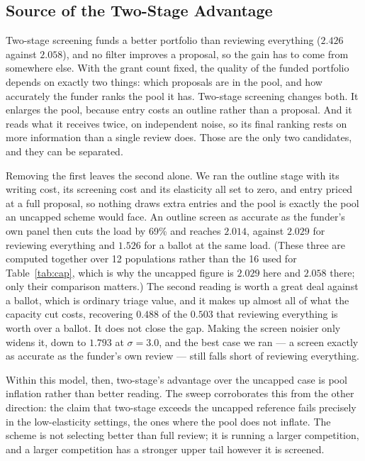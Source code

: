 \documentclass[11pt,a4paper]{article}
\begin{document}
\subsection{Source of the Two-Stage Advantage}
\label{sec:why}

Two-stage screening funds a better portfolio than reviewing everything ($2.426$
against $2.058$), and no filter improves a proposal, so the gain has to come from
somewhere else. With the grant count fixed, the quality of the funded portfolio
depends on exactly two things: which proposals are in the pool, and how accurately
the funder ranks the pool it has. Two-stage screening changes both. It enlarges
the pool, because entry costs an outline rather than a proposal. And it reads
what it receives twice, on independent noise, so its final ranking rests on more
information than a single review does. Those are the only two candidates, and they
can be separated.

Removing the first leaves the second alone. We ran the outline stage with its
writing cost, its screening cost and its elasticity all set to zero, and entry
priced at a full proposal, so nothing draws extra entries and the pool is exactly
the pool an uncapped scheme would face. An outline screen as accurate as the
funder's own panel then cuts the load by 69\% and reaches $2.014$, against
$2.029$ for reviewing everything and $1.526$ for a ballot at the same load. (These
three are computed together over 12 populations rather than the 16 used for
Table~\ref{tab:cap}, which is why the uncapped figure is $2.029$ here and $2.058$
there; only their comparison matters.) The second reading is worth a great deal
against a ballot, which is ordinary triage value, and it makes up almost all of
what the capacity cut costs, recovering $0.488$ of the $0.503$ that reviewing
everything is worth over a ballot. It does not close the gap. Making the screen
noisier only widens it, down to $1.793$ at $\sigma=3.0$, and the best case we ran
--- a screen exactly as accurate as the funder's own review --- still falls short
of reviewing everything.

Within this model, then, two-stage's advantage over the uncapped case is pool
inflation rather than better reading. The sweep corroborates this from the other
direction: the claim that two-stage exceeds the uncapped reference fails precisely
in the low-elasticity settings, the ones where the pool does not inflate. The
scheme is not selecting better than full review; it is running a larger
competition, and a larger competition has a stronger upper tail however it is
screened.
\end{document}
